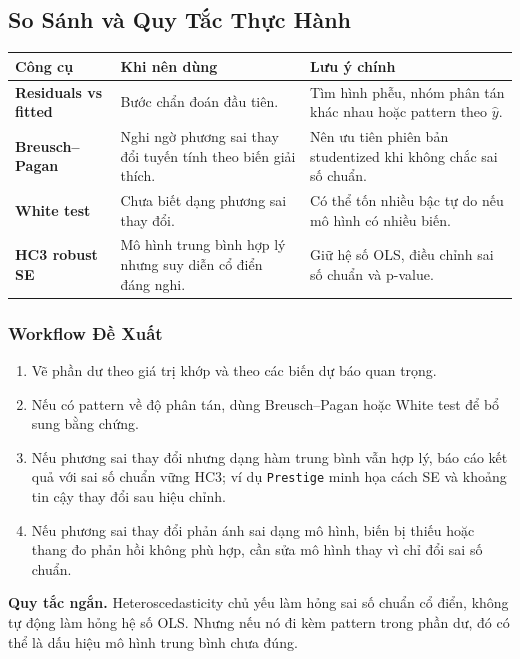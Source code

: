 \subsection{So Sánh và Quy Tắc Thực Hành}

\begin{center}
\small
\begin{tabularx}{\textwidth}{@{}>{\bfseries}l>{\raggedright\arraybackslash}X>{\raggedright\arraybackslash}X@{}}
\toprule
Công cụ & Khi nên dùng & Lưu ý chính \\
\midrule
Residuals vs fitted & Bước chẩn đoán đầu tiên. & Tìm hình phễu, nhóm phân tán khác nhau hoặc pattern theo $\hat y$. \\
Breusch--Pagan & Nghi ngờ phương sai thay đổi tuyến tính theo biến giải thích. & Nên ưu tiên phiên bản studentized khi không chắc sai số chuẩn. \\
White test & Chưa biết dạng phương sai thay đổi. & Có thể tốn nhiều bậc tự do nếu mô hình có nhiều biến. \\
HC3 robust SE & Mô hình trung bình hợp lý nhưng suy diễn cổ điển đáng nghi. & Giữ hệ số OLS, điều chỉnh sai số chuẩn và p-value. \\
\bottomrule
\end{tabularx}
\end{center}

\subsubsection{Workflow Đề Xuất}

\begin{enumerate}
  \item Vẽ phần dư theo giá trị khớp và theo các biến dự báo quan trọng.
  \item Nếu có pattern về độ phân tán, dùng Breusch--Pagan hoặc White test để bổ sung bằng chứng.
  \item Nếu phương sai thay đổi nhưng dạng hàm trung bình vẫn hợp lý, báo cáo kết quả với sai số chuẩn vững HC3; ví dụ \texttt{Prestige} minh họa cách SE và khoảng tin cậy thay đổi sau hiệu chỉnh.
  \item Nếu phương sai thay đổi phản ánh sai dạng mô hình, biến bị thiếu hoặc thang đo phản hồi không phù hợp, cần sửa mô hình thay vì chỉ đổi sai số chuẩn.
\end{enumerate}

\begin{tipbox}
\textbf{Quy tắc ngắn.} Heteroscedasticity chủ yếu làm hỏng sai số chuẩn cổ điển, không tự động làm hỏng hệ số OLS. Nhưng nếu nó đi kèm pattern trong phần dư, đó có thể là dấu hiệu mô hình trung bình chưa đúng.
\end{tipbox}

